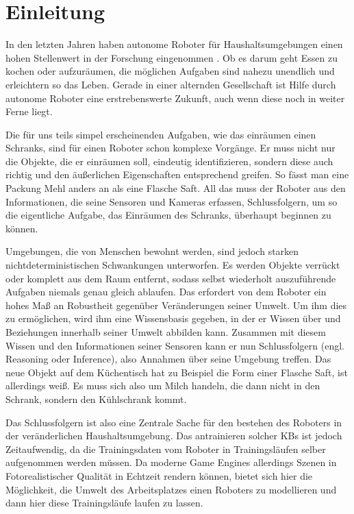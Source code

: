 \graphicspath{{./images/}}      
\def\CHAPTERONE{./chapters/Chapter-1} 

\chapter{Einleitung}
\label{chap:introduction}
%	
In den letzten Jahren haben autonome Roboter für Haushaltsumgebungen einen hohen Stellenwert in der Forschung eingenommen . Ob es darum geht Essen zu kochen oder aufzuräumen, die möglichen Aufgaben sind nahezu unendlich und erleichtern so das Leben. Gerade in einer alternden Gesellschaft  ist Hilfe durch autonome Roboter eine erstrebenswerte Zukunft, auch wenn diese noch in weiter Ferne liegt. \par
Die für uns teils simpel erscheinenden Aufgaben, wie das einräumen einen Schranks, sind für einen Roboter schon komplexe Vorgänge. Er muss nicht nur die Objekte, die er einräumen soll, eindeutig identifizieren, sondern diese auch richtig und den äußerlichen Eigenschaften entsprechend greifen. So fässt man eine Packung Mehl anders an als eine Flasche Saft. All das muss der Roboter aus den Informationen, die seine Sensoren und Kameras erfassen, Schlussfolgern, um so die eigentliche Aufgabe, das Einräumen des Schranks, überhaupt beginnen zu können. \par
Umgebungen, die von Menschen bewohnt werden, sind jedoch starken nichtdeterministischen Schwankungen unterworfen. Es werden Objekte verrückt oder komplett aus dem Raum entfernt, sodass selbst wiederholt auszuführende Aufgaben niemals genau gleich ablaufen. Das erfordert von dem Roboter ein hohes Maß an Robustheit gegenüber Veränderungen seiner Umwelt. Um ihm dies zu ermöglichen, wird ihm eine Wissensbasis gegeben, in der er Wissen über und Beziehungen innerhalb seiner Umwelt abbilden kann. Zusammen mit diesem Wissen und den Informationen seiner Sensoren kann er nun Schlussfolgern (engl. Reasoning oder Inference), also Annahmen über seine Umgebung treffen. Das neue Objekt auf dem Küchentisch hat zu Beispiel die Form einer Flasche Saft, ist allerdings weiß. Es muss sich also um Milch handeln, die dann nicht in den Schrank, sondern den Kühlschrank kommt. \par 
Das Schlussfolgern ist also eine Zentrale Sache für den bestehen des Roboters in der veränderlichen Haushaltsumgebung. Das antrainieren solcher KBs ist jedoch Zeitaufwendig, da die Trainingsdaten vom Roboter in Trainingsläufen selber aufgenommen werden müssen. Da moderne Game Engines allerdings Szenen in Fotorealistischer Qualität in Echtzeit rendern können, bietet sich hier die Möglichkeit, die Umwelt des Arbeitsplatzes einen Roboters zu modellieren und dann hier diese Trainingsläufe laufen zu lassen. \par
